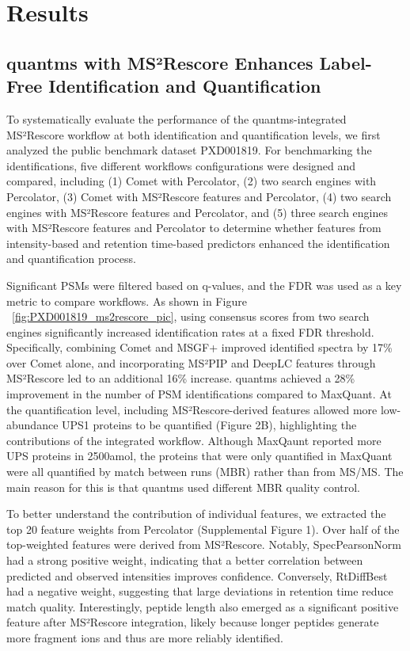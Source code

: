 \documentclass[12pt]{article}
\begin{document}
\section{Results}

\subsection{quantms with MS²Rescore Enhances Label-Free Identification and Quantification}
To systematically evaluate the performance of the quantms-integrated MS²Rescore workflow at both identification and quantification levels, we first analyzed the public benchmark dataset PXD001819. For benchmarking the identifications, five different workflows configurations were designed and compared, including (1) Comet with Percolator, (2) two search engines with Percolator, (3) Comet with MS²Rescore features and Percolator, (4) two search engines with MS²Rescore features and Percolator, and (5) three search engines with MS²Rescore features and Percolator to determine whether features from intensity-based and retention time-based predictors enhanced the identification and quantification process. %

Significant PSMs were filtered based on q-values, and the FDR was used as a key metric to compare workflows. As shown in Figure ~\ref{fig:PXD001819_ms2rescore_pic}, using consensus scores from two search engines significantly increased identification rates at a fixed FDR threshold. Specifically, combining Comet and MSGF+ improved identified spectra by 17\% over Comet alone, and incorporating MS²PIP and DeepLC features through MS²Rescore led to an additional 16\% increase. quantms achieved a 28\% improvement in the number of PSM identifications compared to MaxQuant. At the quantification level, including MS²Rescore-derived features allowed more low-abundance UPS1 proteins to be quantified (Figure 2B), highlighting the contributions of the integrated workflow. Although MaxQaunt reported more UPS proteins in 2500amol, the proteins that were only quantified in MaxQuant were all quantified by match between runs (MBR) rather than from MS/MS. The main reason for this is that quantms used different MBR quality control.

To better understand the contribution of individual features, we extracted the top 20 feature weights from Percolator (Supplemental Figure 1). Over half of the top-weighted features were derived from MS²Rescore. Notably, SpecPearsonNorm had a strong positive weight, indicating that a better correlation between predicted and observed intensities improves confidence. Conversely, RtDiffBest had a negative weight, suggesting that large deviations in retention time reduce match quality. Interestingly, peptide length also emerged as a significant positive feature after MS²Rescore integration, likely because longer peptides generate more fragment ions and thus are more reliably identified.
\end{document}
